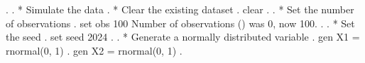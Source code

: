 . 
. * Simulate the data
. * Clear the existing dataset
. clear
{\smallskip}
. 
. * Set the number of observations
. set obs 100
Number of observations ({}) was 0, now 100.
{\smallskip}
. 
. * Set the seed
. set seed 2024
{\smallskip}
. 
. * Generate a normally distributed variable
. gen X1 = rnormal(0, 1)
{\smallskip}
. gen X2 = rnormal(0, 1)
{\smallskip}
. 
